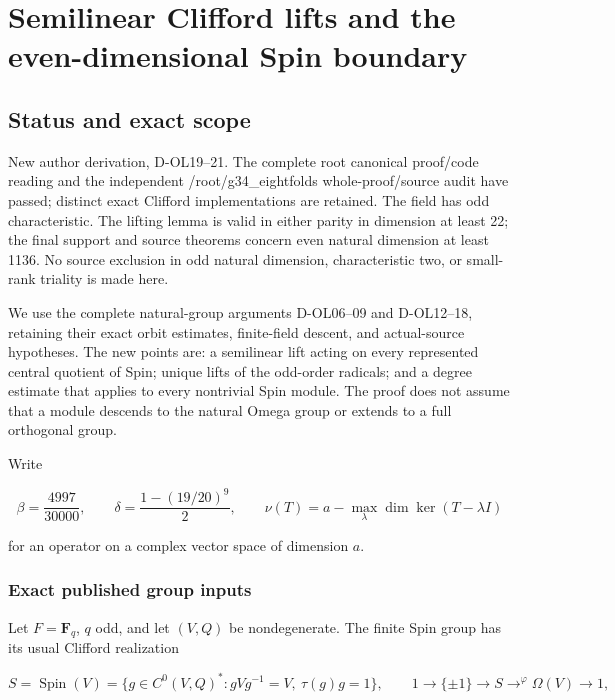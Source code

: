 \section{Semilinear Clifford lifts and the even-dimensional Spin boundary}\label{SF-SPIN:semilinear-clifford-lifts-and-the-even-dimensional-spin-boundary}

\subsection{Status and exact scope}\label{SF-SPIN:status-and-exact-scope}

New author derivation, D-OL19--21. The complete root canonical proof/code reading and the independent /root/g34\_eightfolds whole-proof/source audit have passed; distinct exact Clifford implementations are retained. The field has odd characteristic. The lifting lemma is valid in either parity in dimension at least 22; the final support and source theorems concern even natural dimension at least 1136. No source exclusion in odd natural dimension, characteristic two, or small-rank triality is made here.

We use the complete natural-group arguments D-OL06--09 and D-OL12--18, retaining their exact orbit estimates, finite-field descent, and actual-source hypotheses. The new points are: a semilinear lift acting on every represented central quotient of Spin; unique lifts of the odd-order radicals; and a degree estimate that applies to every nontrivial Spin module. The proof does not assume that a module descends to the natural Omega group or extends to a full orthogonal group.

Write

\[
 \beta=\frac{4997}{30000},\qquad
 \delta=\frac{1-(19/20)^9}{2},\qquad
 \nu(T)=a-\max_\lambda\dim\ker(T-\lambda I)
 \tag{SP.1}
\]

for an operator on a complex vector space of dimension \(a\).

\subsubsection{Exact published group inputs}\label{SF-SPIN:exact-published-group-inputs}

Let \(F=\mathbf F_q\), \(q\) odd, and let \((V,Q)\) be nondegenerate. The finite Spin group has its usual Clifford realization

\[
 S=\operatorname{Spin}(V)
 =\{g\in C^0(V,Q)^*:gVg^{-1}=V,\ \tau(g)g=1\},
 \qquad
 1\longrightarrow\{\pm1\}\longrightarrow S
 \mathop{\longrightarrow}^{\varphi}\Omega(V)\longrightarrow1,
 \tag{SP.2}
\]

